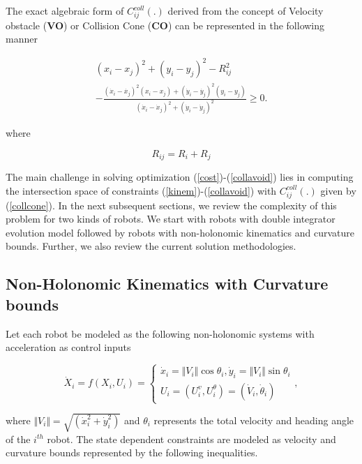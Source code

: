 \documentclass[letterpaper, 10 pt, conference]{IEEEtran}  %
\begin{document}
The exact algebraic form of $C_{ij}^{coll}(.)$ derived from the concept of Velocity obstacle (\textbf{VO}) or Collision Cone (\textbf{CO}) can be represented in the following manner

\begin{eqnarray}
(x_i-x_j)^2+(y_i-y_j)^2-R_{ij}^2\label{collcone}\\\nonumber
-\frac{(\dot{x}_i-\dot{x_j})^2(x_i-x_j)+(\dot{y}_i-\dot{y_j})^2(y_i-y_j)}{(\dot{x}_i-\dot{x}_j)^2+(\dot{y}_i-\dot{y}_j)^2} \geq 0.
\end{eqnarray}

where 

\begin{equation}
R_{ij} = R_i+R_j
\end{equation}

The main challenge in solving optimization (\ref{cost})-(\ref{collavoid}) lies in computing the intersection space of constraints (\ref{kinem})-(\ref{collavoid}) with $C_{ij}^{coll}(.)$ given by (\ref{collcone}). In the next subsequent sections, we review the complexity of this problem for two kinds of robots. We start with robots with double integrator evolution model followed by robots with non-holonomic kinematics and curvature bounds. Further, we also review the current solution methodologies.


 

\subsection{Non-Holonomic Kinematics with Curvature bounds}

Let each robot be modeled as the following non-holonomic systems with acceleration as control inputs


\begin{equation}
\dot{X}_i = f(X_i,U_i)= \left\{
                \begin{array}{ll}
                  \dot{x}_i = \Vert V_i\Vert \cos\theta_i, \dot{y}_i=\Vert V_i\Vert\sin\theta_i\\
                   U_i = (U_i^v, U_i^\theta) = (\dot{V}_i, \dot{\theta}_i)
                \end{array}
              \right.,
\label{evolnonhol}              
\end{equation}

where $\Vert V_i\Vert = \sqrt{(\dot{x}_i^2+\dot{y}_i^2)}$ and $\theta_i$ represents the total velocity and heading angle of the $i^{th}$ robot. The state dependent constraints are modeled as velocity and curvature bounds represented by the following inequalities.
\end{document}
